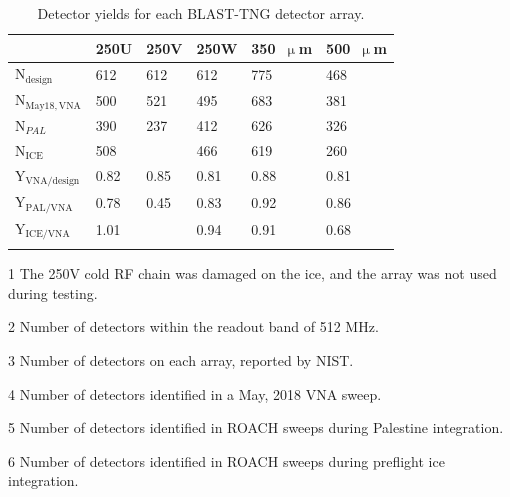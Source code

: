 \begin{table}[!htbp]
  \centering
  \begin{threeparttable}
    \caption[~Detector yields for each BLAST-TNG detector array.]{Detector yields for each BLAST-TNG detector array.}
\begin{tabular}{@{}llllll@{}}
\dtoprule
                        & 250U       & 250V \tnote{1} & 250W    &350~$\upmu$m       & 500~$\upmu$m \\ \midrule
N$_{\mathrm{design}}$\tnote{3}   & 612        & 612         & 612        & 775\tnote{2}     & 468     \\
N$_{\mathrm{May18,VNA}}$\tnote{4}& 500        & 521         & 495        & 683              & 381     \\
N$_{PAL}$ \tnote{5}     & 390        & 237         & 412        & 626              & 326     \\
N$_{\mathrm{ICE}}$ \tnote{6}     & 508        &             & 466        & 619              & 260     \\
Y$_{\mathrm{VNA/design}}$\tnote{7} & 0.82     & 0.85        & 0.81       & 0.88             & 0.81    \\
Y$_{\mathrm{PAL/VNA}}$           & 0.78       & 0.45        & 0.83       & 0.92             & 0.86    \\
Y$_{\mathrm{ICE/VNA}}$           & 1.01       &             & 0.94       & 0.91             & 0.68    \\ \dbottomrule
\\
\end{tabular}
\begin{tablenotes}
\item [1] The 250V cold RF chain was damaged on the ice, and the array was not used during testing.
\item [2] Number of detectors within the readout band of 512 MHz.
\item [3] Number of detectors on each array, reported by NIST.
\item [4] Number of detectors identified in a May, 2018 VNA sweep.
\item [5] Number of detectors identified in ROACH sweeps during Palestine integration.
\item [6] Number of detectors identified in ROACH sweeps during preflight ice integration.
\vspace{2mm}
\end{tablenotes}
\label{table:det yields}
\end{threeparttable}
\end{table}

